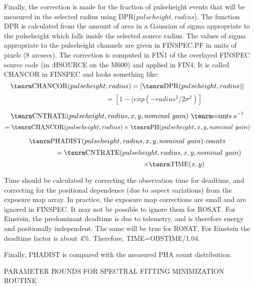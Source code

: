 \vskip 16pt

Finally, the correction is made for the fraction of pulseheight events that will
be measured in the selected radius using DPR($pulseheight,radius$).
The function
DPR is calculated from the amount of area in a Gaussian of sigma
appropriate to the pulseheight which falls inside the selected source radius.
The values of sigma appropriate to the pulseheight channels are given in
FINSPEC.PF in units of pixels (8 arcsecs).
The correction is computed in FIN1 of the overlayed
FINSPEC source code (in :HSOURCE on the M600) and applied in
FIN4.  It is called CHANCOR in FINSPEC and looks something
like:
$$ {\rm CHANCOR}(pulseheight,radius)=[{\rm DPR}(pulseheight,radius)]$$
$$~~~~~~~~~~~~~~~~~~~~~~~~~~~~~~~~~~~=[1-(exp(-radius^2 /2 \sigma^2)]$$

$${\rm CNTRATE}(pulseheight,radius,x,y,nominal~gain)~ {\rm counts~s}^{-1}$$
$$= {\rm CHANCOR}(pulseheight,radius)
\times {\rm PH}(pulseheight,x,y,nominal~gain)$$

$${\rm PHADIST}(pulseheight,radius,x,y,nominal~gain)~counts$$
$$~~~~~~~~~~~~~~~~~~~= {\rm CNTRATE}(pulseheight,radius,x,y,nominal~gain)$$
$$~~~~~~~~~~~~~~~~~~~~~~~~~~~~~~~~~~~~~~~~~ \times {\rm TIME}(x,y)$$


Time should be calculated by correcting the observation time for
deadtime, and correcting for the positional dependence
(due to aspect variations)
from the exposure map array.  In practice, the exposure map corrections
are small and are ignored in FINSPEC. It may not be possible to
ignore them for ROSAT.  For Einstein, the predominant deadtime is
due to telemetry,
and is therefore energy and positionally independent.  The same will
be true for ROSAT.  For Einstein the deadtime factor is about 4\%.
Therefore, TIME=OBSTIME/1.04.

Finally, PHADIST is compared with the measured PHA count distribution.

\vfill\eject

\def\chapter{\it D.M. Worrall}
\def\version{\it March 5th, 1987.}

\vskip 24pt

\vskip 18pt

\centerline{PARAMETER BOUNDS FOR SPECTRAL FITTING MINIMIZATION ROUTINE}

